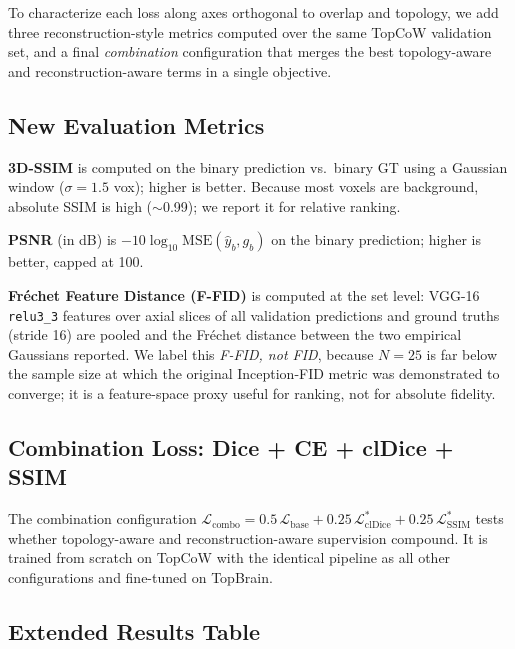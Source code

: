\documentclass[conference]{IEEEtran}
\begin{document}
To characterize each loss along axes orthogonal to overlap and topology, we add three reconstruction-style metrics computed over the same TopCoW validation set, and a final \emph{combination} configuration that merges the best topology-aware and reconstruction-aware terms in a single objective.

\subsection{New Evaluation Metrics}

\noindent\textbf{3D-SSIM} is computed on the binary prediction vs.\ binary GT using a Gaussian window ($\sigma{=}1.5$ vox); higher is better. Because most voxels are background, absolute SSIM is high ($\sim$0.99); we report it for relative ranking.

\noindent\textbf{PSNR} (in dB) is $-10\log_{10}\text{MSE}(\hat{y}_b, g_b)$ on the binary prediction; higher is better, capped at 100.

\noindent\textbf{Fr\'echet Feature Distance (F-FID)} is computed at the set level: VGG-16 \texttt{relu3\_3} features over axial slices of all validation predictions and ground truths (stride 16) are pooled and the Fr\'{e}chet distance between the two empirical Gaussians reported. We label this \emph{F-FID, not FID}, because $N{=}25$ is far below the sample size at which the original Inception-FID metric was demonstrated to converge; it is a feature-space proxy useful for ranking, not for absolute fidelity.

\subsection{Combination Loss: Dice + CE + clDice + SSIM}

The combination configuration $\mathcal{L}_{\text{combo}} = 0.5\,\mathcal{L}_{\text{base}} + 0.25\,\mathcal{L}_{\text{clDice}}^* + 0.25\,\mathcal{L}_{\text{SSIM}}^*$ tests whether topology-aware and reconstruction-aware supervision compound. It is trained from scratch on TopCoW with the identical pipeline as all other configurations and fine-tuned on TopBrain.

\subsection{Extended Results Table}
\end{document}
